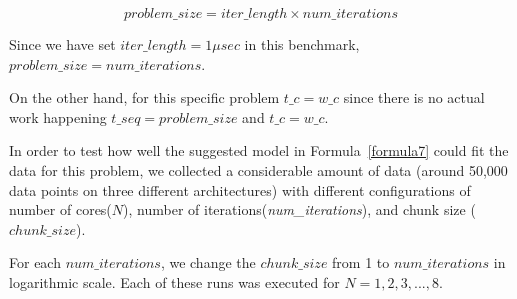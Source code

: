 \begin{equation}\label{problem_size}
problem\_size = iter\_length\times{num\_iterations}
\end{equation}

Since we have set $iter\_{length}=1\mu{sec}$ in this benchmark, $problem\_size = num\_iterations$.
  
On the other hand, for this specific problem $t\_c=w\_c$ since there is no actual work happening  $t\_{seq}=problem\_{size}$ and $t\_c=w\_c$.
 
In order to test how well the suggested model in Formula~\ref{formula7} could fit the data for this problem, we collected a considerable amount of data (around 50,000 data points on three different architectures) with different configurations of number of cores($N$), number of iterations(\emph{num\_{iterations}}), and chunk size ($chunk\_{size}$).  

For each $num\_{iterations}$, we change the $chunk\_{size}$ from 1 to $num\_{iterations}$ in logarithmic scale. Each of these runs was executed for $N=1,2,3,...,8$.  

